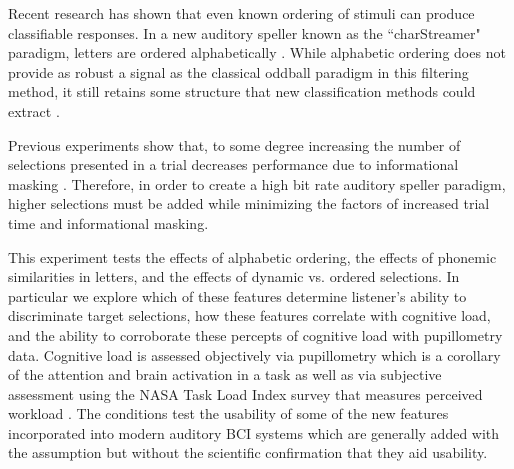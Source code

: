 \documentclass[10pt]{article}
\begin{document}
Recent research has shown that even known ordering of stimuli can
produce classifiable responses.  In a new auditory speller known
as the “charStreamer" paradigm, letters are ordered
alphabetically \cite{Hohne2014}.  While alphabetic ordering does not
provide as robust a signal as the classical oddball paradigm in this
filtering method, it still retains some structure that
new classification methods could extract \cite{Hohne2014}.  

Previous experiments show that, to some degree increasing the number
of selections presented in a trial decreases performance due to
informational masking \cite{Maddox2012a}. Therefore, in order to
create a high bit rate auditory speller paradigm, higher selections
must be added while minimizing the factors of increased trial time
and informational masking. 



This experiment tests the effects of alphabetic ordering, the
effects of phonemic similarities in letters, and the effects
of dynamic vs. ordered selections.  In particular we explore
which of these features determine listener's ability to
discriminate target selections, how these features correlate
with cognitive load, and the ability to corroborate these
percepts of cognitive load with pupillometry data.  Cognitive load is
assessed objectively via pupillometry which is a corollary of
the attention and brain activation in a task as well as via
subjective assessment using the NASA Task Load Index survey
that measures perceived workload \cite{Zickler2013a}.  The
conditions test the usability of some of the new features
incorporated into modern auditory BCI systems which are
generally added with the assumption but without the scientific
confirmation that they aid usability.    


\end{document}
